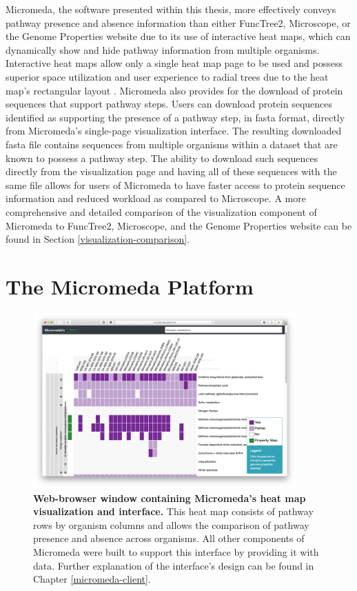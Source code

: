 Micromeda, the software presented within this thesis, more effectively conveys 
pathway presence and absence information than either FuncTree2, Microscope, or 
the Genome Properties website due to its use of interactive heat maps, which can 
dynamically show and hide pathway information from multiple organisms. 
Interactive heat maps allow only a single heat map page to be used and possess 
superior space utilization and user experience to radial trees due to the heat 
map's rectangular layout \cite{muramalla2017radial}. Micromeda also provides for 
the download of protein sequences that support pathway steps. Users can download 
protein sequences identified as supporting the presence of a pathway step, in 
\gls{fasta} format, directly from Micromeda's single-page visualization 
interface. The resulting downloaded \gls{fasta} file contains sequences from 
multiple organisms within a dataset that are known to possess a pathway step. 
The ability to download such sequences directly from the visualization page and 
having all of these sequences with the same file allows for users of Micromeda 
to have faster access to protein sequence information and reduced workload as 
compared to Microscope. A more comprehensive and detailed comparison of the 
visualization component of Micromeda to FuncTree2, Microscope, and the Genome 
Properties website can be found in Section \ref{visualization-comparison}.

\section{The Micromeda Platform} \label{micromeda-overview}

\begin{figure}[!ht]
  \centering
	\includegraphics[width=0.9\textwidth]{media/Micromeda-Simple-Overview.png}
	 \caption[Web-browser window containing Micromeda’s heat map visualization 
and interface.] {\textbf{Web-browser window containing Micromeda’s heat map 
visualization and interface.} This heat map consists of pathway rows by organism 
columns and allows the comparison of pathway presence and absence across 
organisms. All other components of Micromeda were built to support this 
interface by providing it with data. Further explanation of the interface’s 
design can be found in Chapter \ref{micromeda-client}.}
	 \label{fig:basic-heatmap-overview}
\end{figure}


